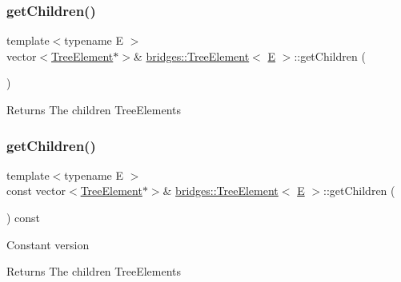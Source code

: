 \subsubsection{\texorpdfstring{getChildren()}{getChildren()}\hspace{0.1cm}{\footnotesize\ttfamily [1/2]}}
{\footnotesize\ttfamily template$<$typename E $>$ \\
vector$<$\mbox{\hyperlink{classbridges_1_1_tree_element}{Tree\+Element}}$\ast$$>$\& \mbox{\hyperlink{classbridges_1_1_tree_element}{bridges\+::\+Tree\+Element}}$<$ \mbox{\hyperlink{namespacebridges_acfb0a4f7877d8f63de3e6862004c50eda3a3ea00cfc35332cedf6e5e9a32e94da}{E}} $>$\+::get\+Children (\begin{DoxyParamCaption}{ }\end{DoxyParamCaption})\hspace{0.3cm}{\ttfamily [inline]}}

\begin{DoxyReturn}{Returns}
The children Tree\+Elements 
\end{DoxyReturn}
\mbox{\label{classbridges_1_1_tree_element_a5695c33c22a81a3225fa7b37c2bdf34f}} 
\subsubsection{\texorpdfstring{getChildren()}{getChildren()}\hspace{0.1cm}{\footnotesize\ttfamily [2/2]}}
{\footnotesize\ttfamily template$<$typename E $>$ \\
const vector$<$\mbox{\hyperlink{classbridges_1_1_tree_element}{Tree\+Element}}$\ast$$>$\& \mbox{\hyperlink{classbridges_1_1_tree_element}{bridges\+::\+Tree\+Element}}$<$ \mbox{\hyperlink{namespacebridges_acfb0a4f7877d8f63de3e6862004c50eda3a3ea00cfc35332cedf6e5e9a32e94da}{E}} $>$\+::get\+Children (\begin{DoxyParamCaption}{ }\end{DoxyParamCaption}) const\hspace{0.3cm}{\ttfamily [inline]}}

Constant version

\begin{DoxyReturn}{Returns}
The children Tree\+Elements 
\end{DoxyReturn}
\mbox{\label{classbridges_1_1_tree_element_a6b264d7391442a742edf96bdd5ee5442}} 
